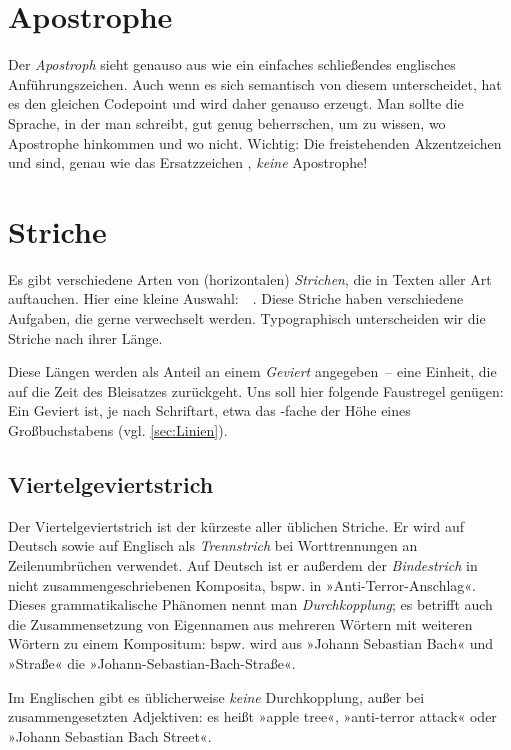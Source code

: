 \section{Apostrophe}

Der \emph{Apostroph}  sieht genauso aus wie ein einfaches schließendes
englisches Anführungszeichen. Auch wenn es sich semantisch von diesem
unterscheidet, hat es den gleichen Codepoint und wird daher genauso erzeugt.
Man sollte die Sprache, in der man schreibt, gut genug beherrschen, um zu
wissen, wo Apostrophe hinkommen und wo nicht.  Wichtig: Die freistehenden
Akzentzeichen \Char{\textasciigrave} und  sind, genau wie das
Ersatzzeichen \Char{\textquotesingle}, \emph{keine} Apostrophe!

\section{Striche}

Es gibt verschiedene Arten von (horizontalen) \emph{Strichen}, die in Texten
aller Art auftauchen.  Hier eine kleine Auswahl:
\Char{-}\,\Char{--}\,\Char{---}\,\Char{$-$}\,\Char{$=$}.  Diese Striche haben
verschiedene Aufgaben, die gerne verwechselt werden.  Typographisch
unterscheiden wir die Striche nach ihrer Länge.

Diese Längen werden als Anteil an einem \emph{Geviert} angegeben~--
eine Einheit, die auf die Zeit des Bleisatzes zurückgeht.  Uns soll
hier folgende Faustregel genügen: Ein Geviert ist, je nach Schriftart,
etwa das -fache der Höhe eines Großbuchstabens
(vgl. \cref{sec:Linien}).

\subsection{Viertelgeviertstrich}
Der Viertelgeviertstrich \Char{-} ist der kürzeste aller üblichen
Striche.  Er wird auf Deutsch sowie auf Englisch als \emph{Trennstrich} bei
Worttrennungen an Zeilenumbrüchen verwendet.  Auf Deutsch ist er außerdem der
\emph{Bindestrich} in nicht zusammenge\-schriebenen Komposita, bspw. in
»Anti-Terror-Anschlag«.  Dieses grammatikalische Phänomen nennt man
\emph{Durchkopplung}; es betrifft auch die Zusammensetzung von Eigennamen aus
mehreren Wörtern mit weiteren Wörtern zu einem Kompositum: bspw. wird aus
»Johann Sebastian Bach« und »Straße« die »Johann-Sebastian-Bach-Straße«.

Im Englischen gibt es üblicherweise \emph{keine} Durchkopplung, außer
bei zusammengesetzten Adjektiven: es heißt »apple tree«, »anti-terror
attack« oder »Johann Sebastian Bach Street«.

